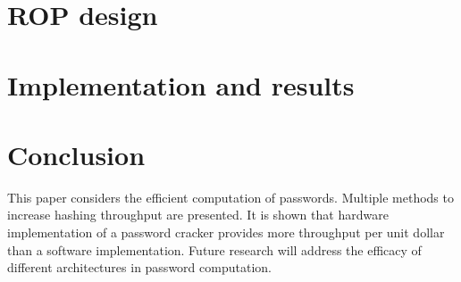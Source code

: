 \section{ROP design}


\section{Implementation and results}


\section{Conclusion}


	This paper considers the efficient computation of passwords. Multiple methods to increase hashing throughput are presented. It is shown that hardware implementation of a password cracker provides more throughput per unit dollar than a software implementation. Future research will address the efficacy of different architectures in password computation. 





